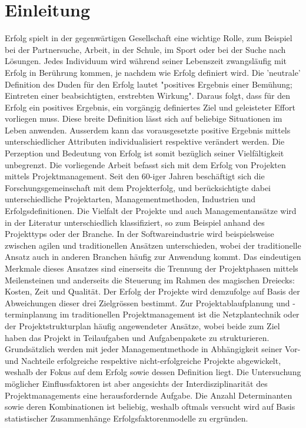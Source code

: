 \section{Einleitung}
Erfolg spielt in der gegenwärtigen Gesellschaft eine wichtige Rolle, zum Beispiel bei der Partnersuche, Arbeit, in der Schule, im Sport oder bei der Suche nach Lösungen. Jedes Individuum wird während seiner Lebenszeit zwangsläufig mit Erfolg in Berührung kommen, je nachdem wie Erfolg definiert wird. Die 'neutrale' Definition des Duden für den Erfolg lautet "positives Ergebnis einer Bemühung; Eintreten einer beabsichtigten, erstrebten Wirkung". Daraus folgt, dass für den Erfolg ein positives Ergebnis, ein vorgängig definiertes Ziel und geleisteter Effort vorliegen muss. Diese breite Definition lässt sich auf beliebige Situationen im Leben anwenden. Ausserdem kann das vorausgesetzte positive Ergebnis mittels unterschiedlicher Attributen individualisiert respektive verändert werden. Die Perzeption und Bedeutung von Erfolg ist somit bezüglich seiner Vielfältigkeit unbegrenzt.
\newline\newline Die vorliegende Arbeit befasst sich mit dem Erfolg von Projekten mittels Projektmanagement. Seit den 60-iger Jahren beschäftigt sich die Forschungsgemeinschaft mit dem Projekterfolg, und berücksichtigte dabei unterschiedliche Projektarten, Managementmethoden, Industrien und Erfolgsdefinitionen. Die Vielfalt der Projekte und auch Managementansätze  wird in der Literatur unterschiedlich klassifiziert, so zum Beispiel anhand des Projekttyps oder der Branche. In der Softwareindustrie wird beispielsweise zwischen agilen und traditionellen Ansätzen unterschieden, wobei der traditionelle Ansatz auch in anderen Branchen häufig zur Anwendung kommt. Das eindeutigen Merkmale dieses Ansatzes sind einerseits die Trennung der Projektphasen mittels Meilensteinen und anderseits die Steuerung im Rahmen des magischen Dreiecks: Kosten, Zeit und Qualität. Der Erfolg der Projekte wird demzufolge auf Basis der Abweichungen dieser drei Zielgrössen bestimmt. Zur Projektablaufplanung und -terminplanung im traditionellen Projektmanagement ist die Netzplantechnik oder der Projektstrukturplan häufig angewendeter Ansätze, wobei beide zum Ziel haben das Projekt in Teilaufgaben und Aufgabenpakete zu strukturieren. Grundsätzlich werden mit jeder Managementmethode in Abhängigkeit seiner Vor- und Nachteile erfolgreiche respektive nicht-erfolgreiche Projekte abgewickelt, weshalb der Fokus auf dem Erfolg sowie dessen Definition liegt. Die Untersuchung möglicher Einflussfaktoren ist aber angesichts der Interdisziplinarität des Projektmanagements eine herausfordernde Aufgabe. Die Anzahl Determinanten sowie deren Kombinationen ist beliebig, weshalb oftmals versucht wird auf Basis statistischer Zusammenhänge Erfolgsfaktorenmodelle zu ergründen.
